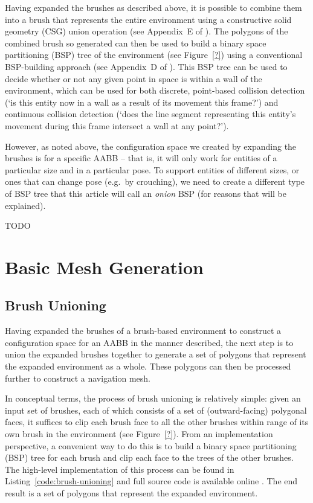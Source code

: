 \documentclass[10pt,twocolumn]{article}
\begin{document}
Having expanded the brushes as described above, it is possible to combine them into a brush that represents the entire environment using a constructive solid geometry (CSG) union operation (see Appendix~E of \cite{golodetz06}). The polygons of the combined brush so generated can then be used to build a binary space partitioning (BSP) tree of the environment (see Figure~\ref{?}) using a conventional BSP-building approach (see Appendix~D of \cite{golodetz06}). This BSP tree can be used to decide whether or not any given point in space is within a wall of the environment, which can be used for both discrete, point-based collision detection (`is this entity now in a wall as a result of its movement this frame?') and continuous collision detection (`does the line segment representing this entity's movement during this frame intersect a wall at any point?').

However, as noted above, the configuration space we created by expanding the brushes is for a specific AABB -- that is, it will only work for entities of a particular size and in a particular pose. To support entities of different sizes, or ones that can change pose (e.g.~by crouching), we need to create a different type of BSP tree that this article will call an \emph{onion} BSP (for reasons that will be explained).

TODO

\fi

\section{Basic Mesh Generation}
\label{sec:meshgen}

\subsection{Brush Unioning}

Having expanded the brushes of a brush-based environment to construct a configuration space for an AABB in the manner described, the next step is to union the expanded brushes together to generate a set of polygons that represent the expanded environment as a whole. These polygons can then be processed further to construct a navigation mesh.

In conceptual terms, the process of brush unioning is relatively simple: given an input set of brushes, each of which consists of a set of (outward-facing) polygonal faces, it suffices to clip each brush face to all the other brushes within range of its own brush in the environment (see Figure~\ref{?}). From an implementation perspective, a convenient way to do this is to build a binary space partitioning (BSP) tree for each brush and clip each face to the trees of the other brushes. The high-level implementation of this process can be found in Listing~\ref{code:brush-unioning} and full source code is available online \cite{hesperus}. The end result is a set of polygons that represent the expanded environment.
\end{document}
